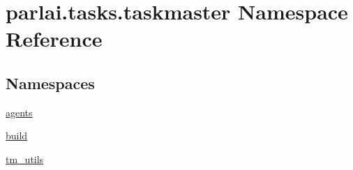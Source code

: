\hypertarget{namespaceparlai_1_1tasks_1_1taskmaster}{}\section{parlai.\+tasks.\+taskmaster Namespace Reference}
\label{namespaceparlai_1_1tasks_1_1taskmaster}
\subsection*{Namespaces}
\begin{DoxyCompactItemize}
\item 
 \hyperlink{namespaceparlai_1_1tasks_1_1taskmaster_1_1agents}{agents}
\item 
 \hyperlink{namespaceparlai_1_1tasks_1_1taskmaster_1_1build}{build}
\item 
 \hyperlink{namespaceparlai_1_1tasks_1_1taskmaster_1_1tm__utils}{tm\+\_\+utils}
\end{DoxyCompactItemize}
